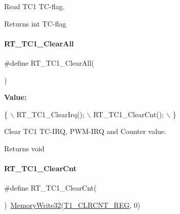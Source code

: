 Read T\+C1 T\+C-\/flag. 

\begin{DoxyReturn}{Returns}
int T\+C-\/flag 
\end{DoxyReturn}
\mbox{\label{a00044_a2a7757de241add69f5fffc4e1dfa431a}} 
\paragraph{\texorpdfstring{R\+T\+\_\+\+T\+C1\+\_\+\+Clear\+All}{RT\_TC1\_ClearAll}}
{\footnotesize\ttfamily \#define R\+T\+\_\+\+T\+C1\+\_\+\+Clear\+All(\begin{DoxyParamCaption}{ }\end{DoxyParamCaption})}

{\bfseries Value\+:}
\begin{DoxyCode}
\{                   \(\backslash\)
        RT\_TC1\_ClearIrq(); \(\backslash\)
        RT\_TC1\_ClearCnt(); \(\backslash\)
    \}
\end{DoxyCode}


Clear T\+C1 T\+C-\/\+I\+RQ, P\+W\+M-\/\+I\+RQ and Counter value. 

\begin{DoxyReturn}{Returns}
void 
\end{DoxyReturn}
\mbox{\label{a00044_abcd4f7c1a53b5d0a31f45076725a1ed6}} 
\paragraph{\texorpdfstring{R\+T\+\_\+\+T\+C1\+\_\+\+Clear\+Cnt}{RT\_TC1\_ClearCnt}}
{\footnotesize\ttfamily \#define R\+T\+\_\+\+T\+C1\+\_\+\+Clear\+Cnt(\begin{DoxyParamCaption}{ }\end{DoxyParamCaption})~\mbox{\hyperlink{a00020_a6b9732365b12e48ddb89fe1028b975b0}{Memory\+Write32}}(\mbox{\hyperlink{a00020_adadaa0ab1ebbd7ba9b70dfd24c3ed44da8d9e7af787d31f28782260c199cc8bd5}{T1\+\_\+\+C\+L\+R\+C\+N\+T\+\_\+\+R\+EG}}, 0)}



